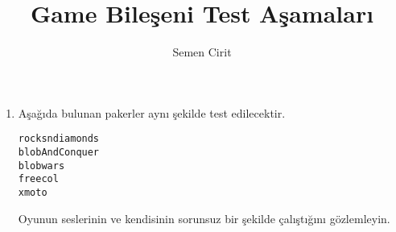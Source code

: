 \documentclass[a4paper,10pt]{article}
\title{Game Bileşeni Test Aşamaları}
\author{Semen Cirit}
\begin{document}
\maketitle

\begin{enumerate}
\item Aşağıda bulunan pakerler aynı şekilde test edilecektir. 
\begin{verbatim}
rocksndiamonds 
blobAndConquer
blobwars
freecol
xmoto
\end{verbatim}

Oyunun seslerinin ve kendisinin sorunsuz bir şekilde çalıştığını gözlemleyin.	
\end{enumerate}
\end{document}
